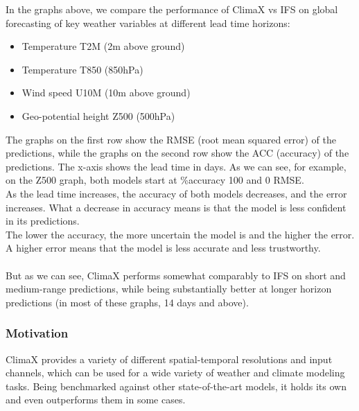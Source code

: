 \documentclass[../paper.tex]{subfiles}
\begin{document}
        In the graphs above,
        we compare the performance of ClimaX vs IFS on global forecasting of key weather variables at different lead time horizons:
        \begin{itemize}
            \item Temperature T2M (2m above ground)
            \item Temperature T850 (850hPa)
            \item Wind speed U10M (10m above ground)
            \item Geo-potential height Z500 (500hPa)
        \end{itemize}
        The graphs on the first row show the RMSE (root mean squared error) of the predictions,
        while the graphs on the second row show the ACC (accuracy) of the predictions.
        The x-axis shows the lead time in days.
        As we can see, for example, on the Z500 graph, both models start at \%accuracy 100 and 0 RMSE.\\
        As the lead time increases, the accuracy of both models decreases, and the error increases.
        What a decrease in accuracy means is that the model is less confident in its predictions.\\
        The lower the accuracy, the more uncertain the model is and the higher the error.
        A higher error means that the model is less accurate and less trustworthy.
        \\\\
        But as we can see, ClimaX performs somewhat comparably to IFS on short and medium-range predictions,
        while being substantially better at longer horizon predictions (in most of these graphs, 14 days and above).
    \subsubsection{Motivation}
        ClimaX provides a variety of different spatial-temporal resolutions and input channels,
        which can be used for a wide variety of weather and climate modeling tasks.
        Being benchmarked against other state-of-the-art models, it holds its own and even outperforms them in some cases.
\end{document}
